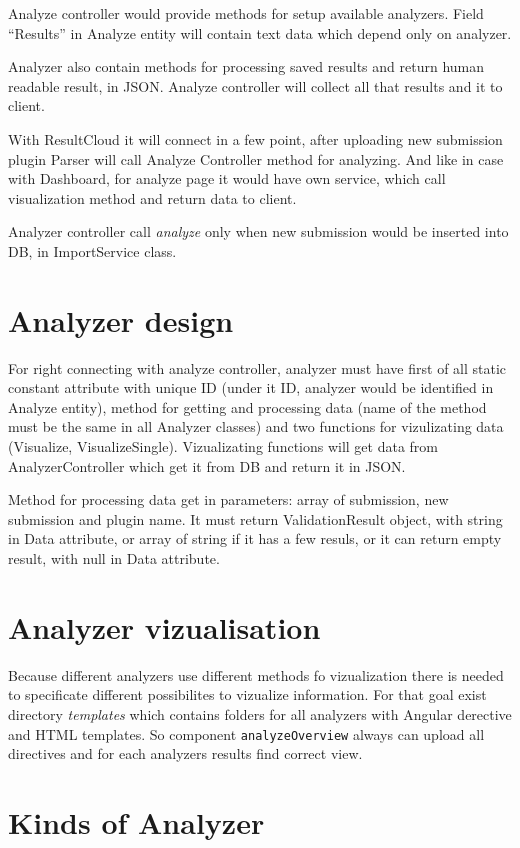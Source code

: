 \documentclass[a4paper,11pt]{article}
\begin{document}
Analyze controller would provide methods for setup available analyzers. Field “Results” in Analyze entity will contain text data which depend only on analyzer. 

Analyzer also contain methods for processing saved results and return human readable result, in JSON. Analyze controller will collect all that results and it to client. 

With ResultCloud it will connect in a few point, after uploading new submission plugin Parser will call Analyze Controller method for analyzing. And like in case with Dashboard, for analyze page it would have own service, which call visualization method and return data to client.

Analyzer controller call \emph{analyze} only when new submission would be inserted into DB, in ImportService class.
\section{Analyzer design}

For right connecting with analyze controller, analyzer must have first of all static constant attribute with unique ID (under it ID, analyzer would be identified in Analyze entity), method for getting and processing data (name of the method must be the same in all Analyzer classes) and two functions for vizulizating data (Visualize, VisualizeSingle). Vizualizating functions will get data from AnalyzerController which get it from DB and return it in JSON.

Method for processing data get in parameters: array of submission, new submission and plugin name. It must return ValidationResult object, with string in Data attribute, or array of string if it has a few resuls, or it can return empty result, with null in Data attribute.

\section{Analyzer vizualisation}

Because different analyzers use different methods fo vizualization there is needed to specificate different possibilites to vizualize information. For that goal exist directory \emph{templates} which contains folders for all analyzers with Angular derective and HTML templates. So component \texttt{analyzeOverview} always can upload all directives and for each analyzers results find correct view.

\section{Kinds of Analyzer}
\end{document}
